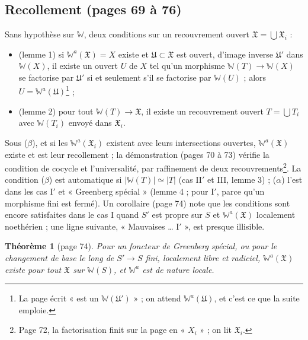 \documentclass[11pt,a4paper]{article}
\begin{document}
\subsection*{Recollement (pages 69 à 76)}

Sans hypothèse sur $\mathbb{W}$, deux conditions sur un recouvrement ouvert
$\mathfrak{X} = \bigcup \mathfrak{X}_i$ :
\begin{itemize}
  \item[($\alpha$)] (lemme 1) si $\mathbb{W}^{a}(\mathfrak{X}) = X$ existe et
  $\mathfrak{U} \subset \mathfrak{X}$ est ouvert, d'image inverse $\mathfrak{U}'$
  dans $\mathbb{W}(X)$, il existe un ouvert $U$ de $X$ tel qu'un morphisme
  $\mathbb{W}(T) \to \mathbb{W}(X)$ se factorise par $\mathfrak{U}'$ si et
  seulement s'il se factorise par $\mathbb{W}(U)$ ; alors $U =
  \mathbb{W}^{a}(\mathfrak{U})$\footnote{La page écrit « est un
  $\mathbb{W}(\mathfrak{U}')$ » ; on attend $\mathbb{W}^{a}(\mathfrak{U})$, et c'est
  ce que la suite emploie.} ;
  \item[($\beta$)] (lemme 2) pour tout $\mathbb{W}(T) \to \mathfrak{X}$, il existe
  un recouvrement ouvert $T = \bigcup T_i$ avec $\mathbb{W}(T_i)$ envoyé dans
  $\mathfrak{X}_i$.
\end{itemize}
Sous ($\beta$), et si les $\mathbb{W}^{a}(\mathfrak{X}_i)$ existent avec leurs
intersections ouvertes, $\mathbb{W}^{a}(\mathfrak{X})$ existe et est leur
recollement ; la démonstration (pages 70 à 73) vérifie la condition de cocycle
et l'universalité, par raffinement de deux recouvrements\footnote{Page 72, la
factorisation finit sur la page en « $X_i$ » ; on lit $\mathfrak{X}_i$.}. La
condition ($\beta$) est automatique si $|\mathbb{W}(T)| \simeq |T|$ (cas II$'$
et III, lemme 3) ; ($\alpha$) l'est dans les cas I$'$ et « Greenberg
spécial » (lemme 4 ; pour I$'$, parce qu'un morphisme fini est fermé). Un corollaire
(page 74) note que les conditions sont encore satisfaites dans le cas I quand
$S'$ est propre sur $S$ et $\mathbb{W}^{a}(\mathfrak{X})$ localement noethérien ;
une ligne suivante, « Mauvaises \ldots{} I$'$ », est presque illisible.

\textbf{Théorème 1} (page 74). \emph{Pour un foncteur de Greenberg spécial, ou
pour le changement de base le long de $S' \to S$ fini, localement libre et
radiciel, $\mathbb{W}^{a}(\mathfrak{X})$ existe pour tout $\mathfrak{X}$ sur
$\mathbb{W}(S)$, et $\mathbb{W}^{a}$ est de nature locale.}
\end{document}
